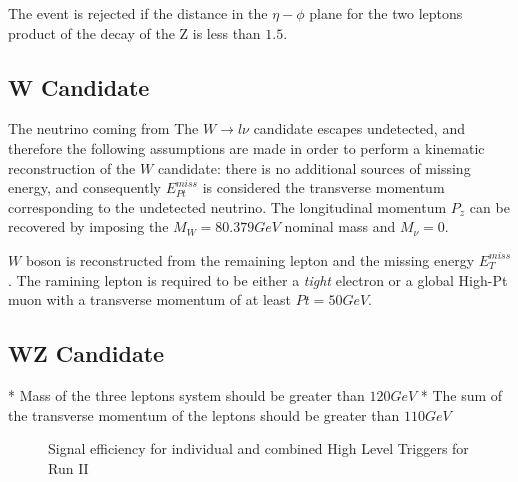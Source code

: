 The event is rejected if the distance in the $\eta-\phi$ plane for the two
leptons product of the decay of the Z is less than $1.5$.

\subsection{W Candidate}

The neutrino coming from The $W \rightarrow l\nu$ candidate escapes undetected,
and therefore the following assumptions are made in order to perform a kinematic
reconstruction of the $W$ candidate: there is no additional sources of missing
energy, and consequently $E_{Pt}^{miss}$ is considered the transverse momentum
corresponding to the undetected neutrino. The longitudinal momentum $P_z$ can be
recovered by imposing the $M_W = 80.379 GeV $ nominal mass and $M_\nu = 0.$



$W$ boson is reconstructed from the remaining lepton and the missing energy
$E_T^{miss}$. The ramining lepton is required to be either
a \emph{tight} electron or a global High-Pt muon with a transverse momentum
of at least $Pt=50GeV$.



\subsection{WZ Candidate}

* Mass of the three leptons system should be greater than $120GeV$
* The sum of the transverse momentum of the leptons should be greater than $110GeV$









\begin{figure}[tph]
  \centering
  \caption{Signal efficiency for individual and combined High Level Triggers for Run II}
  \label{fig:hltSignalEfficiency}
\end{figure}

